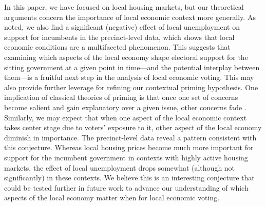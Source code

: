 \documentclass[12pt,a4paper]{article}
\begin{document}
	In this paper, we have focused on local housing markets, but our theoretical arguments concern the importance of local economic context more generally. As noted, we also find a significant (negative) effect of local unemployment on support for incumbents in the precinct-level data, which shows that local economic conditions are a multifaceted phenomenon. This suggests that examining which aspects of the local economy shape electoral support for the sitting government at a given point in time—and the potential interplay between them—is a fruitful next step in the analysis of local economic voting. This may also provide further leverage for refining our contextual priming hypothesis. One implication of classical theories of priming is that once one set of concerns become salient and gain explanatory over a given issue, other concerns fade \citep{ krosnick1990altering}. Similarly, we may expect that when one aspect of the local economic context takes center stage due to voters’ exposure to it, other aspect of the local economy diminish in importance. The precinct-level data reveal a pattern consistent with this conjecture. Whereas local housing prices become much more important for support for the incumbent government in contexts with highly active housing markets, the effect of local unemployment drops somewhat (although not significantly) in these contexts. We believe this is an interesting conjecture that could be tested further in future work to advance our understanding of which aspects of the local economy matter when for local economic voting.
	
\end{document}
